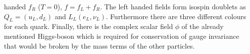 handed $f_R$ ($T=0$), $f=f_L+f_R$. The left handed fields form isospin doublets as $Q_L=(u_L,d_L)$
and $L_L(e_L,\nu_L)$. Furthermore there are three different colours for each quark. 
Finally, there is the complex scalar field $\phi$ of the already mentioned Higgs-boson which is required for conservation of gauge invariance 
that would be broken by the mass terms of the other particles.
